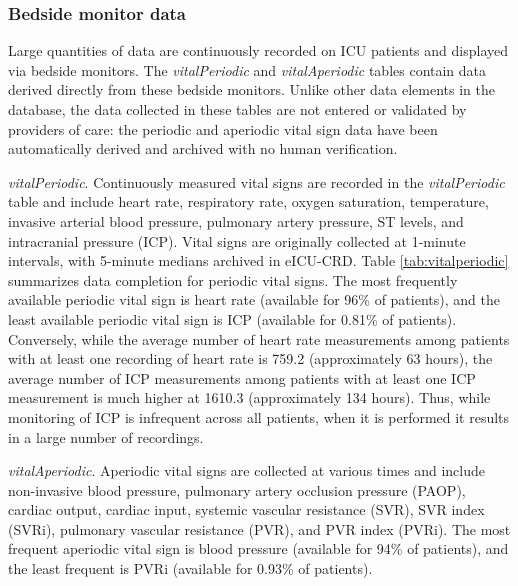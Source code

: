 \documentclass[english]{article}
\newcommand{\tblname}[1]{\emph{#1}}
\begin{document}

\subsubsection*{Bedside monitor data}\label{monitor-data}

Large quantities of data are continuously recorded on ICU patients and
displayed via bedside monitors. The \tblname{vitalPeriodic} and
\tblname{vitalAperiodic} tables contain data derived directly from these
bedside monitors.
Unlike other data elements in the database, the data collected in these tables are not entered or validated by providers of care: the periodic and aperiodic vital sign data have been automatically derived and archived with no human verification.

\tblname{vitalPeriodic}. Continuously measured vital signs are recorded in the \tblname{vitalPeriodic} table
and include heart rate, respiratory rate,
oxygen saturation, temperature, invasive arterial blood pressure,
pulmonary artery pressure, ST levels, and intracranial pressure (ICP).
Vital signs are originally collected at 1-minute intervals, with 5-minute medians archived in eICU-CRD.
Table \ref{tab:vitalperiodic} summarizes data completion for periodic vital signs.
The most frequently available periodic vital sign is heart rate
(available for 96\% of patients), and the least available periodic vital
sign is ICP (available for 0.81\% of patients).
Conversely, while the average number of heart rate measurements among
patients with at least one recording of heart rate is 759.2 (approximately 63 hours),
the average number of ICP measurements among patients with at least one ICP measurement is much higher
at 1610.3 (approximately 134 hours). Thus, while monitoring of ICP is infrequent across all patients,
when it is performed it results in a large number of recordings.


\tblname{vitalAperiodic}. Aperiodic vital signs are collected at various times and include
non-invasive blood pressure, pulmonary artery occlusion pressure (PAOP),
cardiac output, cardiac input, systemic vascular resistance (SVR), SVR
index (SVRi), pulmonary vascular resistance (PVR), and PVR index (PVRi).
The most frequent aperiodic vital sign is blood pressure (available for
94\% of patients), and the least frequent is PVRi (available for 0.93\%
of patients).
\end{document}
